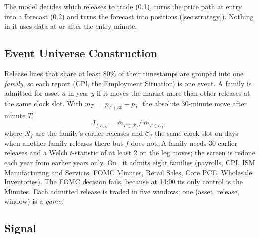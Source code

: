 
The model decides which releases to trade (\ref{sec:universe}), turns the price path at entry into a
forecast (\ref{sec:signal}) and turns the forecast into positions (\ref{sec:strategy}). Nothing in it
uses data at or after the entry minute.

\subsection{Event Universe Construction}\label{sec:universe}

Release lines that share at least 80\% of their timestamps are grouped into one \emph{family}, so
each report (CPI, the Employment Situation) is one event. A family is admitted for asset $a$ in year
$y$ if it moves the market more than other releases at the same clock slot. With
$m_T=|p_{T+30}-p_T|$ the absolute 30-minute move after minute $T$,
\begin{equation}\label{eq:impact}
  I_{f,a,y}=\overline{m}_{T\in\mathcal{R}_f}\big/\,\overline{m}_{T\in\mathcal{C}_f},
\end{equation}
where $\mathcal{R}_f$ are the family's earlier releases and $\mathcal{C}_f$ the same clock slot on
days when another family releases there but $f$ does not. A family needs 30 earlier releases and a
Welch $t$-statistic of at least 2 on the log moves; the screen is redone each year from earlier years
only. On \ES\ it admits eight families (payrolls, CPI, ISM Manufacturing and Services, FOMC Minutes,
Retail Sales, Core PCE, Wholesale Inventories). The FOMC decision fails, because at 14:00 its only
control is the Minutes. Each admitted release is traded in five windows; one (asset, release,
window) is a \emph{game}.

\subsection{Signal}\label{sec:signal}

